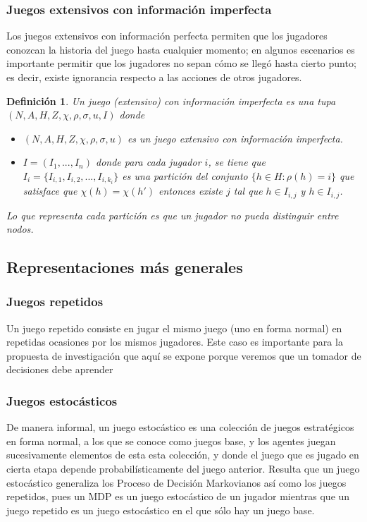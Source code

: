\documentclass[11pt]{article}
\theoremstyle{plain}
\newtheorem{defi}[teo]{Definición}
\begin{document}
\subsubsection{Juegos extensivos con información imperfecta}
Los juegos extensivos con información perfecta permiten que los jugadores conozcan la historia del juego hasta cualquier momento; en algunos escenarios es importante permitir que los jugadores no sepan cómo se llegó hasta cierto punto; es decir, existe ignorancia respecto a las acciones de otros jugadores.
\begin{defi}
Un juego (extensivo) con información imperfecta es una tupa $(N,A,H,Z,\chi,\rho,\sigma, u, I)$ donde
\begin{itemize}
\item $(N,A,H,Z,\chi,\rho,\sigma, u)$ es un juego extensivo con información imperfecta.
\item $I=(I_1,...,I_n)$ donde para cada jugador $i$, se tiene que $I_i = \{ I_{i,1}, I_{i,2}, ... , I_{i,k_i} \}$ es una partición del conjunto $\{ h \in H: \rho(h)=i \}$ que satisface que $\chi(h)=\chi(h')$ entonces existe $j$ tal que $h \in I_{i,j}$ y $h \in I_{i,j}$.
\end{itemize}
Lo que representa cada partición es que un jugador no pueda distinguir entre nodos.
\end{defi}
\subsection{Representaciones más generales}
\subsubsection{Juegos repetidos}
Un juego repetido consiste en jugar el mismo juego (uno en forma normal) en repetidas ocasiones por los mismos jugadores. Este caso es importante para la propuesta de investigación que aquí se expone porque veremos que un tomador de decisiones debe aprender
\subsubsection{Juegos estocásticos}
De manera informal, un juego estocástico es una colección de juegos estratégicos en forma normal, a los que se conoce como juegos base, y los agentes juegan sucesivamente elementos de esta esta colección, y donde el juego que es jugado en cierta etapa depende probabilísticamente del juego anterior. Resulta que un juego estocástico generaliza los Proceso de Decisión Markovianos así como los juegos repetidos, pues un MDP es un juego estocástico de un jugador mientras que un juego repetido es un juego estocástico en el que sólo hay un juego base.
\end{document}
